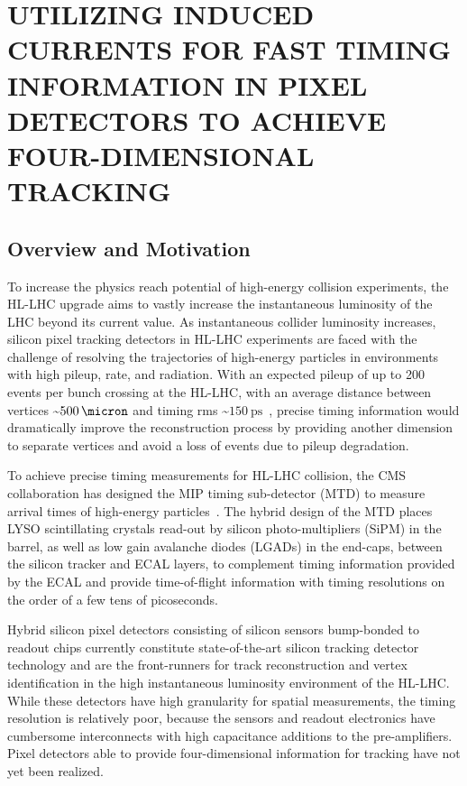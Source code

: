 
\chapter{UTILIZING INDUCED CURRENTS FOR FAST TIMING INFORMATION IN PIXEL DETECTORS TO ACHIEVE FOUR-DIMENSIONAL TRACKING}
\label{Fast_Timing}

\section{Overview and Motivation}
To increase the physics reach potential of high-energy collision experiments, the HL-LHC upgrade aims to vastly increase the instantaneous luminosity of the LHC beyond its current value. 
As instantaneous collider luminosity increases, silicon pixel tracking detectors in HL-LHC experiments are faced with the challenge of resolving the trajectories of high-energy particles in environments with high pileup, rate, and radiation.
With an expected pileup of up to 200 events per bunch crossing at the HL-LHC, with an average distance between vertices \sim$\SI{500}{\micron}$ and timing rms \sim$\SI{150}{\ps}$~\cite{CARTIGLIA201747}, precise timing information would dramatically improve the reconstruction process by providing another dimension to separate vertices and avoid a loss of events due to pileup degradation.

To achieve precise timing measurements for HL-LHC collision, the CMS collaboration has designed the MIP timing sub-detector (MTD) to measure arrival times of high-energy particles~\cite{CMS:2667167}.
The hybrid design of the MTD places LYSO scintillating crystals read-out by silicon photo-multipliers (SiPM) in the barrel, as well as low gain avalanche diodes (LGADs) in the end-caps, between the silicon tracker and ECAL layers, to complement timing information provided by the ECAL and provide time-of-flight information with timing resolutions on the order of a few tens of picoseconds.

Hybrid silicon pixel detectors consisting of silicon sensors bump-bonded to readout chips currently constitute state-of-the-art silicon tracking detector technology and are the front-runners for track reconstruction and vertex identification in the high instantaneous luminosity environment of the HL-LHC.
While these detectors have high granularity for spatial measurements, the timing resolution is relatively poor, because the sensors and readout electronics have cumbersome interconnects with high capacitance additions to the pre-amplifiers. 
Pixel detectors able to provide four-dimensional information for tracking have not yet been realized.

